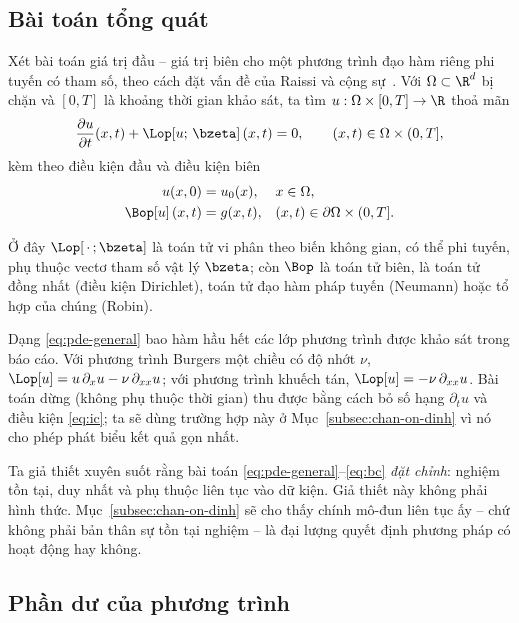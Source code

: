 \subsection{Bài toán tổng quát}
\label{subsec:bai-toan-tong-quat}
 
Xét bài toán giá trị đầu -- giá trị biên cho một phương trình đạo hàm riêng phi
tuyến có tham số, theo cách đặt vấn đề của Raissi và cộng sự~\cite{raissi2019}.
Với $\Omega \subset \R^{d}$ bị chặn và $[0,T]$ là khoảng thời gian khảo sát, ta
tìm $u : \Omega \times [0,T] \to \R$ thoả mãn
\begin{equation}
\frac{\partial u}{\partial t}(x,t) + \Lop\!\left[u;\, \bzeta\right](x,t) = 0,
\qquad (x,t) \in \Omega \times (0,T],
\label{eq:pde-general}
\end{equation}
kèm theo điều kiện đầu và điều kiện biên
\begin{align}
    u(x,0) &= u_{0}(x), && x \in \Omega, \label{eq:ic}\\
    \Bop\!\left[u\right](x,t) &= g(x,t),
      && (x,t) \in \partial\Omega \times (0,T].
    \label{eq:bc}
\end{align}
 
Ở đây $\Lop[\,\cdot\,;\bzeta]$ là toán tử vi phân theo biến không gian, có thể
phi tuyến, phụ thuộc vectơ tham số vật lý $\bzeta$; còn $\Bop$ là toán tử biên,
là toán tử đồng nhất (điều kiện Dirichlet), toán tử đạo hàm pháp tuyến (Neumann)
hoặc tổ hợp của chúng (Robin).
 
Dạng \eqref{eq:pde-general} bao hàm hầu hết các lớp phương trình được khảo sát
trong báo cáo. Với phương trình Burgers một chiều có độ nhớt $\nu$,
$\Lop[u] = u\,\partial_{x} u - \nu\, \partial_{xx} u$; với phương trình khuếch
tán, $\Lop[u] = -\nu\,\partial_{xx} u$. Bài toán dừng (không phụ thuộc thời gian)
thu được bằng cách bỏ số hạng $\partial_t u$ và điều kiện \eqref{eq:ic}; ta sẽ
dùng trường hợp này ở Mục~\ref{subsec:chan-on-dinh} vì nó cho phép phát biểu kết
quả gọn nhất.
 
Ta giả thiết xuyên suốt rằng bài toán \eqref{eq:pde-general}--\eqref{eq:bc}
\emph{đặt chỉnh}: nghiệm tồn tại, duy nhất và phụ thuộc liên tục vào dữ kiện. Giả
thiết này không phải hình thức. Mục~\ref{subsec:chan-on-dinh} sẽ cho thấy chính
mô-đun liên tục ấy -- chứ không phải bản thân sự tồn tại nghiệm -- là đại lượng
quyết định phương pháp có hoạt động hay không.
 
\subsection{Phần dư của phương trình}
\label{subsec:phan-du}
 
